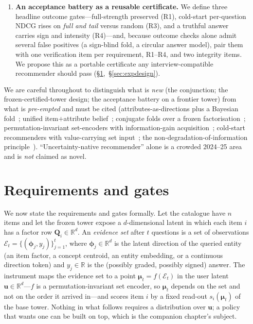 \documentclass[11pt]{article}
\newcommand{\R}{\mathbb{R}}
\newcommand{\Q}{\mathbf{Q}}
\newcommand{\uu}{\mathbf{u}}
\newcommand{\bphi}{\boldsymbol{\phi}}
\newcommand{\bmu}{\boldsymbol{\mu}}
\begin{document}
\begin{enumerate}[leftmargin=1.5em,itemsep=1.5pt]
        bar (\S\ref{sec:gap}).
  \item \textbf{An acceptance battery as a reusable certificate.} We define three headline outcome gates---full-strength
        preserved (R1), cold-start per-question NDCG rises on \emph{full and tail} versus random (R3), and
        a truthful answer carries sign and intensity (R4)---and, because outcome checks alone admit several false positives
        (a sign-blind fold, a circular answer model), pair them with one verification item
        per requirement, R1--R4, and two integrity items. We propose this as a portable certificate any
        interview-compatible recommender should pass (\S\ref{sec:reqs},~\S\ref{sec:expdesign}).
\end{enumerate}

We are careful throughout to distinguish what is \emph{new} (the conjunction; the frozen-certified-tower design; the
acceptance battery on a frontier tower) from what is \emph{pre-empted} and must be cited (attributes-as-directions plus a
Bayesian fold~\cite{biyik2023soft}; unified item$+$attribute belief~\cite{li2021seamlessly}; conjugate folds over a
frozen factorisation~\cite{toroghi2023bcie}; permutation-invariant set-encoders with information-gain
acquisition~\cite{ma2019eddi}; cold-start recommenders with value-carrying set input~\cite{lin2021tanp}; the
non-degradation-of-information principle~\cite{good1967principle,blackwell1953equivalent}). ``Uncertainty-native recommender'' alone is a
crowded 2024--25 area~\cite{wang2025bdecf} and is \emph{not} claimed as novel.

\section{Requirements and gates}\label{sec:reqs}

We now state the requirements and gates formally. Let the catalogue have $n$ items and let the frozen tower expose a
$d$-dimensional latent in which each item $i$ has a factor row $\Q_i\in\R^{d}$. An \emph{evidence set} after $t$
questions is a set of observations $\mathcal E_t=\{(\bphi_j, y_j)\}_{j=1}^{t}$, where $\bphi_j\in\R^{d}$ is the latent
direction of the queried entity (an item factor, a concept centroid, an entity embedding, or a continuous direction
token) and $y_j\in\R$ is the (possibly graded, possibly signed) answer. The instrument maps the evidence set to a
point $\bmu_t = f(\mathcal E_t)$ in the user latent $\uu\in\R^{d}$---$f$ is a permutation-invariant set encoder, so
$\bmu_t$ depends on the set and not on the order it arrived in---and scores item $i$ by a fixed read-out
$s_i(\bmu_t)$ of the base tower. Nothing in what follows requires a distribution over $\uu$; a policy that wants one
can be built on top, which is the companion chapter's subject.
\end{document}
